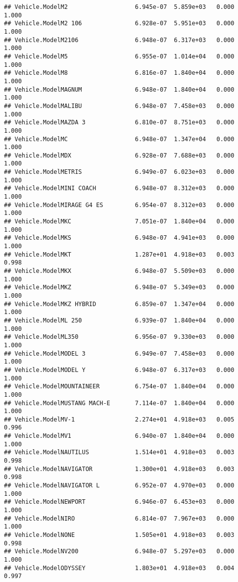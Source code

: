 \documentclass[
]{article}
\begin{document}
\begin{verbatim}
## Vehicle.ModelM2                   6.945e-07  5.859e+03   0.000    1.000
## Vehicle.ModelM2 106               6.928e-07  5.951e+03   0.000    1.000
## Vehicle.ModelM2106                6.948e-07  6.317e+03   0.000    1.000
## Vehicle.ModelM5                   6.955e-07  1.014e+04   0.000    1.000
## Vehicle.ModelM8                   6.816e-07  1.840e+04   0.000    1.000
## Vehicle.ModelMAGNUM               6.948e-07  1.840e+04   0.000    1.000
## Vehicle.ModelMALIBU               6.948e-07  7.458e+03   0.000    1.000
## Vehicle.ModelMAZDA 3              6.810e-07  8.751e+03   0.000    1.000
## Vehicle.ModelMC                   6.948e-07  1.347e+04   0.000    1.000
## Vehicle.ModelMDX                  6.928e-07  7.688e+03   0.000    1.000
## Vehicle.ModelMETRIS               6.949e-07  6.023e+03   0.000    1.000
## Vehicle.ModelMINI COACH           6.948e-07  8.312e+03   0.000    1.000
## Vehicle.ModelMIRAGE G4 ES         6.954e-07  8.312e+03   0.000    1.000
## Vehicle.ModelMKC                  7.051e-07  1.840e+04   0.000    1.000
## Vehicle.ModelMKS                  6.948e-07  4.941e+03   0.000    1.000
## Vehicle.ModelMKT                  1.287e+01  4.918e+03   0.003    0.998
## Vehicle.ModelMKX                  6.948e-07  5.509e+03   0.000    1.000
## Vehicle.ModelMKZ                  6.948e-07  5.349e+03   0.000    1.000
## Vehicle.ModelMKZ HYBRID           6.859e-07  1.347e+04   0.000    1.000
## Vehicle.ModelML 250               6.939e-07  1.840e+04   0.000    1.000
## Vehicle.ModelML350                6.956e-07  9.330e+03   0.000    1.000
## Vehicle.ModelMODEL 3              6.949e-07  7.458e+03   0.000    1.000
## Vehicle.ModelMODEL Y              6.948e-07  6.317e+03   0.000    1.000
## Vehicle.ModelMOUNTAINEER          6.754e-07  1.840e+04   0.000    1.000
## Vehicle.ModelMUSTANG MACH-E       7.114e-07  1.840e+04   0.000    1.000
## Vehicle.ModelMV-1                 2.274e+01  4.918e+03   0.005    0.996
## Vehicle.ModelMV1                  6.940e-07  1.840e+04   0.000    1.000
## Vehicle.ModelNAUTILUS             1.514e+01  4.918e+03   0.003    0.998
## Vehicle.ModelNAVIGATOR            1.300e+01  4.918e+03   0.003    0.998
## Vehicle.ModelNAVIGATOR L          6.952e-07  4.970e+03   0.000    1.000
## Vehicle.ModelNEWPORT              6.946e-07  6.453e+03   0.000    1.000
## Vehicle.ModelNIRO                 6.814e-07  7.967e+03   0.000    1.000
## Vehicle.ModelNONE                 1.505e+01  4.918e+03   0.003    0.998
## Vehicle.ModelNV200                6.948e-07  5.297e+03   0.000    1.000
## Vehicle.ModelODYSSEY              1.803e+01  4.918e+03   0.004    0.997

\end{verbatim}
\end{document}
